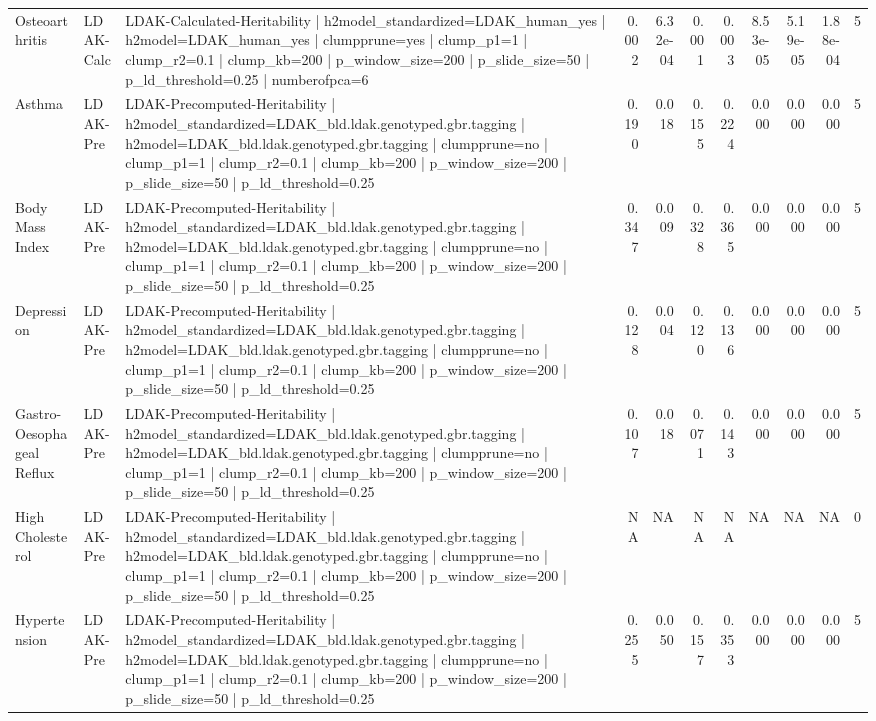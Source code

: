 \begin{landscape}
\begin{longtable}{p{2.4cm}p{1.8cm}p{6.0cm}rrrrrrrr}
Osteoarthritis & LDAK-Calc & LDAK-Calculated-Heritability | h2model\_standardized=LDAK\_human\_yes | h2model=LDAK\_human\_yes | clumpprune=yes | clump\_p1=1 | clump\_r2=0.1 | clump\_kb=200 | p\_window\_size=200 | p\_slide\_size=50 | p\_ld\_threshold=0.25 | numberofpca=6 & 0.002 & 6.32e-04 & 0.001 & 0.003 & 8.53e-05 & 5.19e-05 & 1.88e-04 & 5 \\
Asthma & LDAK-Pre & LDAK-Precomputed-Heritability | h2model\_standardized=LDAK\_bld.ldak.genotyped.gbr.tagging | h2model=LDAK\_bld.ldak.genotyped.gbr.tagging | clumpprune=no | clump\_p1=1 | clump\_r2=0.1 | clump\_kb=200 | p\_window\_size=200 | p\_slide\_size=50 | p\_ld\_threshold=0.25 & 0.190 & 0.018 & 0.155 & 0.224 & 0.000 & 0.000 & 0.000 & 5 \\
Body Mass Index & LDAK-Pre & LDAK-Precomputed-Heritability | h2model\_standardized=LDAK\_bld.ldak.genotyped.gbr.tagging | h2model=LDAK\_bld.ldak.genotyped.gbr.tagging | clumpprune=no | clump\_p1=1 | clump\_r2=0.1 | clump\_kb=200 | p\_window\_size=200 | p\_slide\_size=50 | p\_ld\_threshold=0.25 & 0.347 & 0.009 & 0.328 & 0.365 & 0.000 & 0.000 & 0.000 & 5 \\
Depression & LDAK-Pre & LDAK-Precomputed-Heritability | h2model\_standardized=LDAK\_bld.ldak.genotyped.gbr.tagging | h2model=LDAK\_bld.ldak.genotyped.gbr.tagging | clumpprune=no | clump\_p1=1 | clump\_r2=0.1 | clump\_kb=200 | p\_window\_size=200 | p\_slide\_size=50 | p\_ld\_threshold=0.25 & 0.128 & 0.004 & 0.120 & 0.136 & 0.000 & 0.000 & 0.000 & 5 \\
Gastro-Oesophageal Reflux & LDAK-Pre & LDAK-Precomputed-Heritability | h2model\_standardized=LDAK\_bld.ldak.genotyped.gbr.tagging | h2model=LDAK\_bld.ldak.genotyped.gbr.tagging | clumpprune=no | clump\_p1=1 | clump\_r2=0.1 | clump\_kb=200 | p\_window\_size=200 | p\_slide\_size=50 | p\_ld\_threshold=0.25 & 0.107 & 0.018 & 0.071 & 0.143 & 0.000 & 0.000 & 0.000 & 5 \\
High Cholesterol & LDAK-Pre & LDAK-Precomputed-Heritability | h2model\_standardized=LDAK\_bld.ldak.genotyped.gbr.tagging | h2model=LDAK\_bld.ldak.genotyped.gbr.tagging | clumpprune=no | clump\_p1=1 | clump\_r2=0.1 | clump\_kb=200 | p\_window\_size=200 | p\_slide\_size=50 | p\_ld\_threshold=0.25 & NA & NA & NA & NA & NA & NA & NA & 0 \\
Hypertension & LDAK-Pre & LDAK-Precomputed-Heritability | h2model\_standardized=LDAK\_bld.ldak.genotyped.gbr.tagging | h2model=LDAK\_bld.ldak.genotyped.gbr.tagging | clumpprune=no | clump\_p1=1 | clump\_r2=0.1 | clump\_kb=200 | p\_window\_size=200 | p\_slide\_size=50 | p\_ld\_threshold=0.25 & 0.255 & 0.050 & 0.157 & 0.353 & 0.000 & 0.000 & 0.000 & 5 \\

\end{longtable}
\end{landscape}
